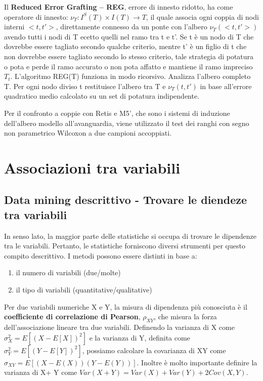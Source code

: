 \documentclass[a4paper]{extarticle}
\begin{document}
Il \textbf{ Reduced Error Grafting – REG}, errore di innesto ridotto, ha come operatore di innesto: $\nu_T : I^S(T) \times I(T) \rightarrow T$, il quale associa ogni coppia di nodi interni $<t,t'>$, direttamente connesso da un ponte con l'albero $\nu_T (<t,t'>)$ avendo tutti i nodi di T ecetto quelli nel ramo tra t e t'. Se t è un nodo di T che dovrebbe essere tagliato secondo qualche criterio, mentre t' è un figlio di t che non dovrebbe essere tagliato secondo lo stesso criterio, tale strategia di potatura o pota e perde il ramo accurato o non pota affatto e mantiene il ramo impreciso $T_t$. L'algoritmo REG(T) funziona in modo ricorsivo. Analizza l'albero completo T. Per ogni nodo diviso t restituisce l'albero tra T e $\nu_T (t,t')$ in base all'errore quadratico medio calcolato su un set di potatura indipendente.

Per il confronto a coppie con Retis e M5', che sono i sistemi di induzione dell'albero modello all'avanguardia, viene utilizzato il test dei ranghi con segno non parametrico Wilcoxon a due campioni accoppiati.

\newpage
\section{Associazioni tra variabili}
\subsection{Data mining descrittivo - Trovare le diendeze tra variabili}

In senso lato, la maggior parte delle statistiche si occupa di trovare le dipendenze tra le variabili. Pertanto, le statistiche forniscono diversi strumenti per questo compito descrittivo. I metodi possono essere distinti in base a:
\begin{enumerate}
\item il numero di variabili (due/molte)
\item il tipo di variabili (quantitative/qualitative)
\end{enumerate}

Per due variabili numeriche X e Y, la misura di dipendenza più conosciuta è il \textbf{coefficiente di correlazione di Pearson}, $\rho_{XY}$, che misura la forza dell’associazione lineare tra due variabili. Definendo la varianza di X come $\sigma^2_X = E[(X - E[X])^2]$ e la varianza di Y, definita come $\sigma^2_Y = E[(Y - E[Y])^2]$, possiamo calcolare la covarianza di XY come $\sigma_{XY} = E[(X - E(X))(Y-E(Y))]$. Inoltre è molto importante definire la varianza di X+ Y come $Var( X + Y) = Var( X ) + Var( Y )+2Cov(X,Y)$.
\end{document}
